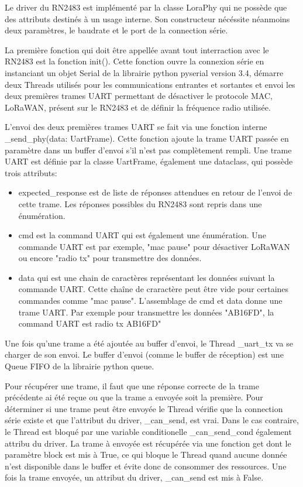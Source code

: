     Le driver du RN2483 est implémenté par la classe LoraPhy qui ne possède que des attributs destinés à un usage interne. Son constructeur nécéssite néanmoins deux paramètres, le baudrate et le port de la connection série.

    La première fonction qui doit être appellée avant tout interraction avec le RN2483 est la fonction init(). Cette fonction ouvre la connexion série en instanciant un objet Serial de la librairie python pyserial version 3.4, démarre deux Threads utilisés pour les communications entrantes et sortantes et envoi les deux premières trames UART permettant de désactiver le protocole MAC, LoRaWAN, présent sur le RN2483 et de définir la fréquence radio utilisée.

    L'envoi des deux premières trames UART se fait via une fonction interne \_send\_phy(data: UartFrame). Cette fonction ajoute la trame UART passée en paramètre dans un buffer d'envoi s'il n'est pas complètement rempli. 
    Une trame UART est définie par la classe UartFrame, également une dataclass, qui possède trois attributs:
    \begin{itemize}
        \item expected\_response est de liste de réponses attendues en retour de l'envoi de cette trame. Les réponses possibles du RN2483 sont repris dans une énumération. 
        \item cmd est la command UART qui est également une énumération. Une commande UART est par exemple, "mac pause" pour désactiver LoRaWAN ou encore "radio tx" pour transmettre des données.
        \item data qui est une chain de caractères représentant les données suivant la commande UART. Cette chaîne de craractère peut être vide pour certaines commandes comme "mac pause".
        L'assemblage de cmd et data donne une trame UART. Par exemple pour transmettre les données "AB16FD", la command UART est radio tx AB16FD"
    \end{itemize}

    Une fois qu'une trame a été ajoutée au buffer d'envoi, le Thread \_uart\_tx va se charger de 
    son envoi. Le buffer d'envoi (comme le buffer de réception) est une Queue FIFO de la librairie 
    python queue.
    
    Pour récupérer une trame, il faut que une réponse correcte de la trame précédente ai été reçue ou que la trame a envoyée soit la première.
    Pour déterminer si une trame peut être envoyée le Thread vérifie que la connection série existe et que l'attribut du driver, \_can\_send, est vrai. Dans le cas contraire, le Thread est bloqué par une variable conditionelle \_can\_send\_cond également attribu du driver.
    La trame à envoyée est récupérée via une fonction get dont le paramètre block est 
    mis à True, ce qui bloque le Thread quand aucune donnée n'est disponible dans le buffer et évite donc de consommer des ressources. Une fois la trame envoyée, un attribut du driver, \_can\_send est mis à False.

